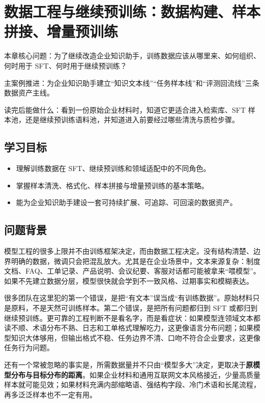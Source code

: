 \chapter{数据工程与继续预训练：数据构建、样本拼接、增量预训练}

\begin{introduction}
\item {\heiti 本章核心问题}：为了继续改造企业知识助手，训练数据应该从哪里来、如何组织、何时用于 SFT、何时用于继续预训练？
\item {\heiti 主案例推进}：为企业知识助手建立“知识文本线”“任务样本线”和“评测回流线”三条数据资产主线。
\item {\heiti 读完后能做什么}：看到一份原始企业材料时，知道它更适合进入检索库、SFT 样本池，还是继续预训练语料池，并知道进入前要经过哪些清洗与质检步骤。
\end{introduction}

\section{学习目标}
\begin{itemize}
  \item 理解训练数据在 SFT、继续预训练和领域适配中的不同角色。
  \item 掌握样本清洗、格式化、样本拼接与增量预训练的基本策略。
  \item 能为企业知识助手建设一套可持续扩展、可追踪、可回滚的数据资产。
\end{itemize}

\section{问题背景}
模型工程的很多上限并不由训练框架决定，而由数据工程决定。没有结构清楚、边界明确的数据，微调只会把混乱放大。尤其是在企业场景中，文本来源复杂：制度文档、FAQ、工单记录、产品说明、会议纪要、客服对话都可能被拿来“喂模型”。如果不先建立数据分层，模型很快就会学到不一致风格、过期事实和模糊表达。

很多团队在这里犯的第一个错误，是把“有文本”误当成“有训练数据”。原始材料只是原料，不是天然可训练样本。第二个错误，是把所有问题都归到 SFT 或都归到继续预训练。更可靠的工程判断不是看名字，而是看症状：如果模型连领域文本都读不顺、术语分布不熟、日志和工单格式理解吃力，这更像语言分布问题；如果模型知识大体够用，但输出格式不稳、任务边界不清、口吻不符合企业要求，这更像任务行为问题。

还有一个常被忽略的事实是，所需数据量并不只由“模型多大”决定，更取决于\textbf{原模型分布与目标分布的距离}。如果企业材料和通用互联网文本风格接近，少量高质量样本就可能见效；如果材料充满内部缩略语、强结构字段、冷门术语和长尾流程，再多泛泛样本也不一定有用。

